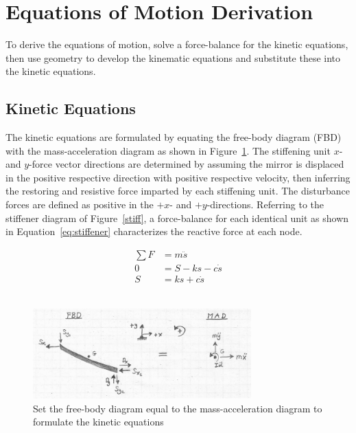 \section{Equations of Motion Derivation}

To derive the equations of motion, solve a force-balance for the kinetic equations, then use geometry to develop the kinematic equations and substitute these into the kinetic equations.

\subsection*{Kinetic Equations}

The kinetic equations are formulated by equating the free-body diagram (FBD) with the mass-acceleration diagram as shown in Figure~\ref{FBD=MAD}. The stiffening unit $x$- and $y$-force vector directions are determined by assuming the mirror is displaced in the positive respective direction with positive respective velocity, then inferring the restoring and resistive force imparted by each stiffening unit. The disturbance forces are defined as positive in the $+x$- and $+y$-directions. Referring to the stiffener diagram of Figure~\ref{stiff}, a force-balance for each identical unit as shown in Equation~\eqref{eq:stiffener} characterizes the reactive force at each node.

\begin{equation}
\label{eq:stiffener}
\begin{aligned}
		\sum{F} &= m\ddot{s}\\
		0 &= S - ks - c\dot{s}\\
		S &= ks + c\dot{s}
\end{aligned}
\end{equation}\

\begin{figure}	%
 \centering
 \includegraphics[width=0.75\textwidth]{Figures/Q5_P1_FBD=MAD.pdf}
 \caption{Set the free-body diagram equal to the mass-acceleration diagram to formulate the kinetic equations}
 \label{FBD=MAD}
\end{figure}

